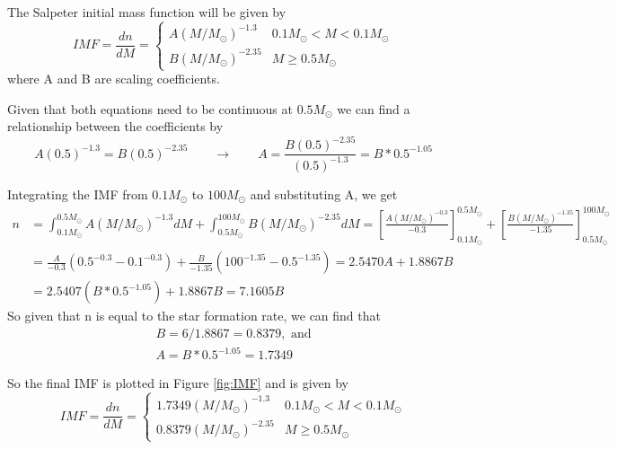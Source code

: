 The Salpeter initial mass function will be given by
\begin{equation*}
    IMF = \frac{dn}{dM} = 
    \begin{cases} 
      A(M/M_\odot)^{-1.3}     & 0.1M_\odot < M < 0.1M_\odot\\
      B(M/M_\odot)^{-2.35}    & M \geq 0.5M_\odot
   \end{cases}
\end{equation*}
where A and B are scaling coefficients. 

Given that both equations need to be continuous at $0.5M_\odot$ we can find a relationship between the coefficients by
\begin{equation*}
    A(0.5)^{-1.3}=B(0.5)^{-2.35} \qquad\rightarrow\qquad A = \frac{B(0.5)^{-2.35}}{(0.5)^{-1.3}} = B*0.5^{-1.05}
\end{equation*}

Integrating the IMF from $0.1M_\odot$ to $100M_\odot$ and substituting A, we get
\begin{align*}
    n &= \int_{0.1M_\odot}^{0.5M_\odot}A(M/M_\odot)^{-1.3}dM + \int_{0.5M_\odot}^{100 M_\odot}B(M/M_\odot)^{-2.35}dM 
    =\left[\frac{A(M/M_\odot)^{-0.3}}{-0.3}\right]_{0.1M_\odot}^{0.5M_\odot} + \left[\frac{B(M/M_\odot)^{-1.35}}{-1.35}\right]_{0.5M_\odot}^{100 M_\odot}\\
    &= \frac{A}{-0.3}(0.5^{-0.3}-0.1^{-0.3})+\frac{B}{-1.35}(100^{-1.35}-0.5^{-1.35})
    = 2.5470A + 1.8867B \\
    &= 2.5407(B*0.5^{-1.05}) + 1.8867B = 7.1605B
\end{align*}
So given that n is equal to the star formation rate, we can find that
\begin{align*}
    B = 6 /1.8867 = 0.8379 ,\text{ and}\\
    A = B*0.5^{-1.05} = 1.7349 
\end{align*}

So the final IMF is plotted in Figure \ref{fig:IMF} and is given by
\begin{equation*}
    IMF = \frac{dn}{dM} = 
    \begin{cases} 
      1.7349(M/M_\odot)^{-1.3}     & 0.1M_\odot < M < 0.1M_\odot\\
      0.8379(M/M_\odot)^{-2.35}    & M \geq 0.5M_\odot
   \end{cases}
\end{equation*}


